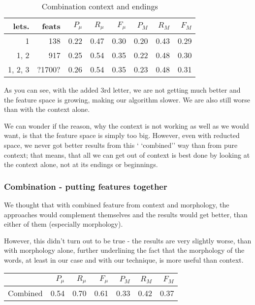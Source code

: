 \documentclass[letterpaper]{article}
\begin{document}
\begin{table}


\begin{tabular}{|r|r|r|r|r|r|r|r|}
\hline
lets.&feats & $P_\mu$ & $R_\mu$ & $F_\mu$ & $P_M$ & $R_M$  & $F_M$ \\ \hline
1 & 138 & 0.22 & 0.47 & 0.30 & 0.20 & 0.43 & 0.29 \\ \hline
1, 2  & 917 & 0.25 & 0.54 & 0.35 & 0.22 & 0.48 & 0.30 \\ \hline
1, 2, 3  & ?1700? & 0.26 & 0.54 & 0.35 & 0.23 & 0.48 & 0.31 \\ \hline

\end{tabular}
\caption{Combination context and endings}
\end{table}
As you can see, with the added 3rd letter, we are not getting much better and 
the feature space is growing, making our algorithm slower. We are also still worse than with the context alone.


We can wonder if the reason, why the context is not working as 
well as we would want, is that the feature space is simply too big. 
However, even with reducted space, we never got better results from this `
`combined'' way than from pure context; that means, that all we can get out of context 
is best done by looking at the context alone, not at its endings or beginnings.

\subsubsection{Combination - putting features together}
We thought that with combined feature from context and morphology, the approaches would complement 
themselves and the results would get better, than either of them (especially morphology).

However, this didn't turn out to be true - the results are very slightly worse, than with morphology alone, 
further underlining the fact that the morphology of the words, at least in our case and with our technique, 
is more useful than context.

\begin{tabular}{|r|r|r|r|r|r|r|}
 \hline
 & $P_\mu$ & $R_\mu$ & $F_\mu$ & $P_M$ & $R_M$  & $F_M$ \\ \hline
Combined & 0.54 & 0.70 & 0.61 & 0.33 & 0.42 & 0.37 \\ \hline
\end{tabular}
\end{document}
